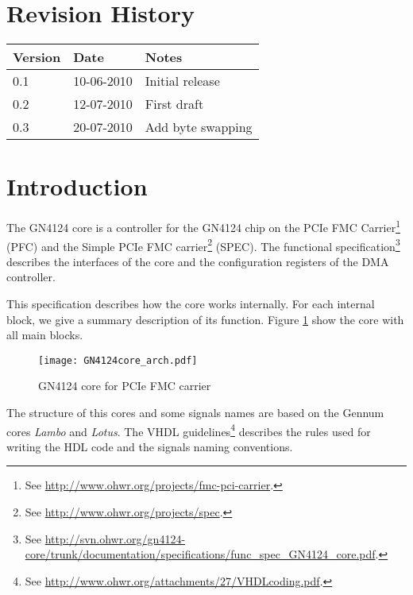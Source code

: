 \documentclass[10pt,a4paper]{cerndoc}
\begin{document}
  \cerntitle
  \section*{Revision History}
  \begin{tabularx}{\textwidth}{|p{3cm}|p{3cm}|X|}
    \hline \textbf{Version}&\textbf{Date}&\textbf{Notes}\\ \hline \hline
    0.1 & 10-06-2010 & Initial release\\ \hline
    0.2 & 12-07-2010 & First draft\\ \hline
    0.3 & 20-07-2010 & Add byte swapping\\ \hline

  \end{tabularx}

  \tableofcontents
  \listoffigures
  \clearpage

  \section*{Introduction}
The GN4124 core is a controller for the GN4124 chip on the PCIe FMC Carrier\footnote{See \href{http://www.ohwr.org/projects/fmc-pci-carrier}{http://www.ohwr.org/projects/fmc-pci-carrier}.} (PFC) and the Simple PCIe FMC carrier\footnote{See \href{http://www.ohwr.org/projects/spec}{http://www.ohwr.org/projects/spec}.} (SPEC).
The functional specification\footnote{See \href{http://svn.ohwr.org/gn4124-core/trunk/documentation/specifications/func_spec_GN4124_core.pdf}{http://svn.ohwr.org/gn4124-core/trunk/documentation/specifications/func\_spec\_GN4124\_core.pdf}.} describes the interfaces of the core and the configuration registers of the DMA controller.

This specification describes how the core works internally. For each internal block, we give a summary description of its function. Figure \ref{fig:GN4124core_arch} show the core with all main blocks. 




\begin{figure}[!ht]
  \centering
    \texttt{[image: GN4124core\_arch.pdf]}
  \caption{GN4124 core for PCIe FMC carrier}
  \label{fig:GN4124core_arch}
\end{figure}

The structure of this cores and some signals names are based on the Gennum cores \emph{Lambo} and \emph{Lotus}. 
The VHDL guidelines\footnote{See \href{http://www.ohwr.org/attachments/27/VHDLcoding.pdf}{http://www.ohwr.org/attachments/27/VHDLcoding.pdf}.} describes the rules used for writing the HDL code and the signals naming conventions.
\end{document}
